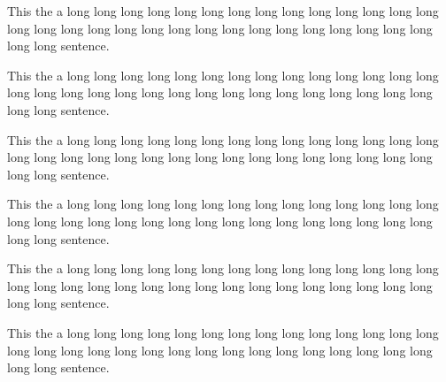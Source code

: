 \documentclass[letterpaper,twocolumn,10pt]{article}
\begin{document}
This the a long long long long long long long long long long long
 long long long long long long long long long long long long long
 long long long long long long long long sentence.

This the a long long long long long long long long long long long
 long long long long long long long long long long long long long
 long long long long long long long long sentence.

This the a long long long long long long long long long long long
 long long long long long long long long long long long long long
 long long long long long long long long sentence.

This the a long long long long long long long long long long long
 long long long long long long long long long long long long long
 long long long long long long long long sentence.

This the a long long long long long long long long long long long
 long long long long long long long long long long long long long
 long long long long long long long long sentence.


This the a long long long long long long long long long long long
 long long long long long long long long long long long long long
 long long long long long long long long sentence.
\end{document}
